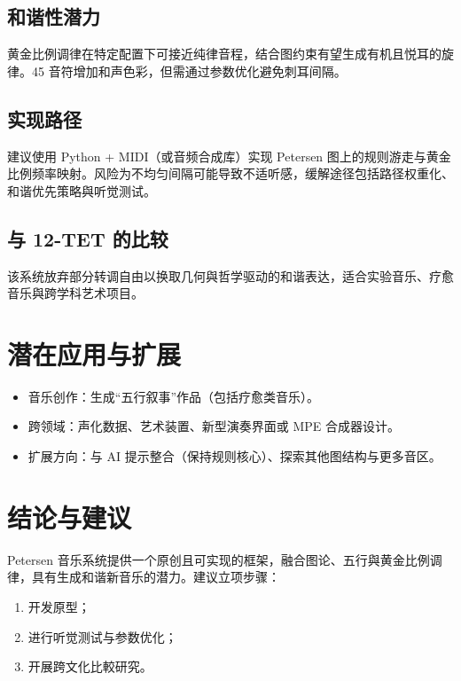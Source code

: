 \documentclass{article}
\begin{document}
\subsection{和谐性潜力}
黄金比例调律在特定配置下可接近纯律音程，结合图约束有望生成有机且悦耳的旋律。45 音符增加和声色彩，但需通过参数优化避免刺耳间隔。

\subsection{实现路径}
建议使用 Python + MIDI（或音频合成库）实现 Petersen 图上的规则游走与黄金比例频率映射。风险为不均匀间隔可能导致不适听感，缓解途径包括路径权重化、和谐优先策略與听觉测试。

\subsection{与 12-TET 的比较}
该系统放弃部分转调自由以换取几何與哲学驱动的和谐表达，适合实验音乐、疗愈音乐與跨学科艺术项目。

\section{潜在应用与扩展}
\begin{itemize}
  \item 音乐创作：生成“五行叙事”作品（包括疗愈类音乐）。
  \item 跨领域：声化数据、艺术装置、新型演奏界面或 MPE 合成器设计。
  \item 扩展方向：与 AI 提示整合（保持规则核心）、探索其他图结构与更多音区。
\end{itemize}

\section{结论与建议}
Petersen 音乐系统提供一个原创且可实现的框架，融合图论、五行與黄金比例调律，具有生成和谐新音乐的潜力。建议立项步骤：
\begin{enumerate}
  \item 开发原型；
  \item 进行听觉测试与参数优化；
  \item 开展跨文化比較研究。
\end{enumerate}
\end{document}
